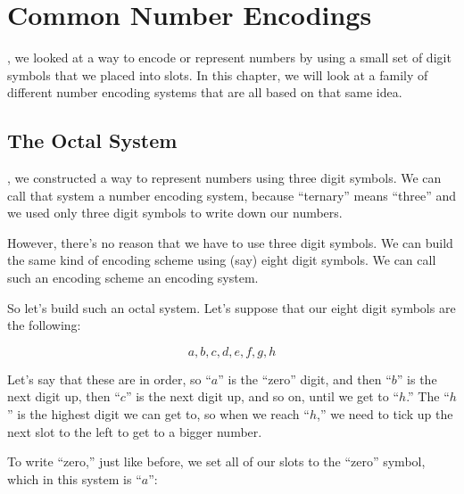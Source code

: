 \documentclass[../../../main.tex]{subfiles}
\begin{document}
\chapter{Common Number Encodings}
\label{ch:number-encodings}

, we looked at a way to encode or represent numbers by using a small set of digit symbols that we placed into slots. In this chapter, we will look at a family of different number encoding systems that are all based on that same idea.


\section{The Octal System}

, we constructed a way to represent numbers using three digit symbols. We can call that system a  number encoding system, because ``ternary'' means ``three'' and we used only three digit symbols to write down our numbers.

However, there's no reason that we have to use three digit symbols. We can build the same kind of encoding scheme using (say) eight digit symbols. We can call such an encoding scheme an  encoding system. 

So let's build such an octal system. Let's suppose that our eight digit symbols are the following:

\begin{equation*}
  a, b, c, d, e, f, g, h
\end{equation*}

Let's say that these are in order, so ``$a$'' is the ``zero'' digit, and then ``$b$'' is the next digit up, then ``$c$'' is the next digit up, and so on, until we get to ``$h$.'' The ``$h$'' is the highest digit we can get to, so when we reach ``$h$,'' we need to tick up the next slot to the left to get to a bigger number.

To write ``zero,'' just like before, we set all of our slots to the ``zero'' symbol, which in this system is ``$a$'':
\end{document}
